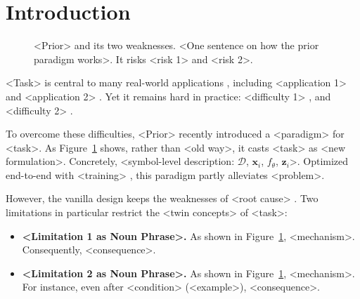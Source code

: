 \section{Introduction}

\begin{figure}[t]
    \centering
    \caption{<Prior> and its two weaknesses. <One sentence on how the prior paradigm works>. It risks <risk 1> and <risk 2>.}
    \label{fig:teaser-figure}
    \vspace{-12pt}
\end{figure}

<Task> is central to many real-world applications \cite{Placeholder-A, Placeholder-B}, including <application 1> and <application 2> \cite{Placeholder-C}.
Yet it remains hard in practice: <difficulty 1> \cite{Placeholder-A}, and <difficulty 2> \cite{Placeholder-B}.

To overcome these difficulties, <Prior> \cite{Placeholder-A} recently introduced a <paradigm> for <task>.
As Figure~\ref{fig:teaser-figure} shows, rather than <old way>, it casts <task> as <new formulation>.
Concretely, <symbol-level description: $\mathcal{D}$, $\mathbf{x}_i$, $f_\theta$, $\mathbf{z}_i$>.
Optimized end-to-end with <training> \cite{Placeholder-B}, this paradigm partly alleviates <problem>.

However, the vanilla design keeps the weaknesses of <root cause> \cite{Placeholder-C}.
Two limitations in particular restrict the <twin concepts> of <task>:
\begin{itemize}[leftmargin=*]
    \item \textbf{<Limitation 1 as Noun Phrase>.}
    As shown in Figure~\ref{fig:teaser-figure}, <mechanism>. Consequently, <consequence>.
    \item \textbf{<Limitation 2 as Noun Phrase>.}
    As shown in Figure~\ref{fig:teaser-figure}, <mechanism>. For instance, even after <condition> (\eg <example>), <consequence>.
\end{itemize}

